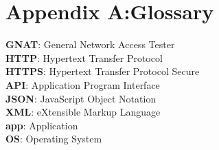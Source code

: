 \documentclass{scrreprt}
\begin{document}
\section{Appendix A:\@ Glossary}
\textbf{GNAT}: General Network Access Tester\\
\textbf{HTTP}: Hypertext Transfer Protocol\\
\textbf{HTTPS}: Hypertext Transfer Protocol Secure\\
\textbf{API}: Application Program Interface\\
\textbf{JSON}: JavaScript Object Notation\\
\textbf{XML}: eXtensible Markup Language\\
\textbf{app}: Application\\
\textbf{OS}: Operating System\\
\end{document}

